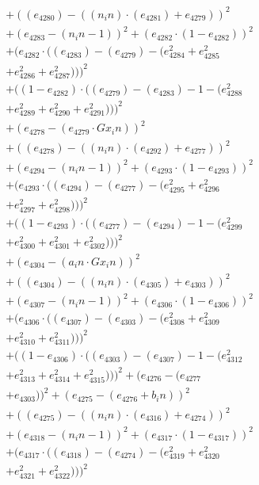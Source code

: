 \documentclass[10pt, a4paper]{article}
\begin{document}
\begin{align*}
& + ((e_{4280}) - ((n_in)  \cdot  (e_{4281}) + e_{4279}))^{2} \\
& + (e_{4283} - (n_in - 1))^{2} + (e_{4282}  \cdot  (1 - e_{4282}))^{2} \\
& + (e_{4282}  \cdot  ((e_{4283}) - (e_{4279}) - (e_{4284}^{2} + e_{4285}^{2} \\
& + e_{4286}^{2} + e_{4287}^{2})))^{2} \\
& + ((1 - e_{4282})  \cdot  ((e_{4279}) - (e_{4283}) - 1 - (e_{4288}^{2} \\
& + e_{4289}^{2} + e_{4290}^{2} + e_{4291}^{2})))^{2} \\
& + (e_{4278} - (e_{4279}  \cdot  Gx_in))^{2} \\
& + ((e_{4278}) - ((n_in)  \cdot  (e_{4292}) + e_{4277}))^{2} \\
& + (e_{4294} - (n_in - 1))^{2} + (e_{4293}  \cdot  (1 - e_{4293}))^{2} \\
& + (e_{4293}  \cdot  ((e_{4294}) - (e_{4277}) - (e_{4295}^{2} + e_{4296}^{2} \\
& + e_{4297}^{2} + e_{4298}^{2})))^{2} \\
& + ((1 - e_{4293})  \cdot  ((e_{4277}) - (e_{4294}) - 1 - (e_{4299}^{2} \\
& + e_{4300}^{2} + e_{4301}^{2} + e_{4302}^{2})))^{2} \\
& + (e_{4304} - (a_in  \cdot  Gx_in))^{2} \\
& + ((e_{4304}) - ((n_in)  \cdot  (e_{4305}) + e_{4303}))^{2} \\
& + (e_{4307} - (n_in - 1))^{2} + (e_{4306}  \cdot  (1 - e_{4306}))^{2} \\
& + (e_{4306}  \cdot  ((e_{4307}) - (e_{4303}) - (e_{4308}^{2} + e_{4309}^{2} \\
& + e_{4310}^{2} + e_{4311}^{2})))^{2} \\
& + ((1 - e_{4306})  \cdot  ((e_{4303}) - (e_{4307}) - 1 - (e_{4312}^{2} \\
& + e_{4313}^{2} + e_{4314}^{2} + e_{4315}^{2})))^{2} + (e_{4276} - (e_{4277} \\
& + e_{4303}))^{2} + (e_{4275} - (e_{4276} + b_in))^{2} \\
& + ((e_{4275}) - ((n_in)  \cdot  (e_{4316}) + e_{4274}))^{2} \\
& + (e_{4318} - (n_in - 1))^{2} + (e_{4317}  \cdot  (1 - e_{4317}))^{2} \\
& + (e_{4317}  \cdot  ((e_{4318}) - (e_{4274}) - (e_{4319}^{2} + e_{4320}^{2} \\
& + e_{4321}^{2} + e_{4322}^{2})))^{2} \\

\end{align*}
\end{document}
